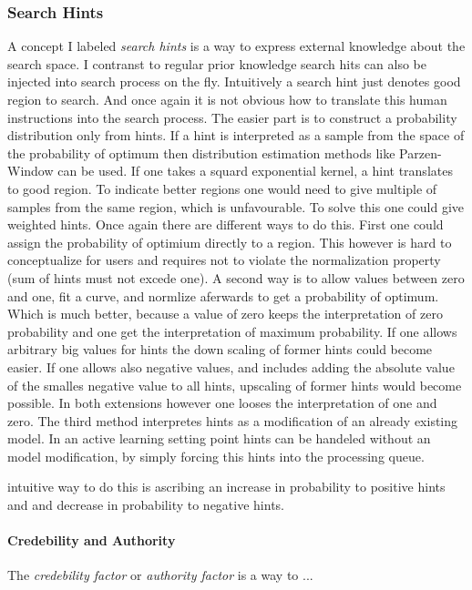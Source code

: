 \documentclass[english]{article}
\begin{document}
\subsubsection*{Search Hints}
A concept I labeled \textit{search hints} is a way to express external knowledge about the search space. I contranst to regular prior knowledge search hits can also be injected into search process on the fly. Intuitively a search hint just denotes good region to search. And once again it is not obvious how to translate this human instructions into the search process.
The easier part is to construct a probability distribution only from hints. If a hint is interpreted as a sample from the space of the probability of optimum then distribution estimation methods like Parzen-Window can be used. If one takes a squard exponential kernel, a hint translates to good region. To indicate better regions one would need to give multiple of samples from the same region, which is unfavourable. To solve this one could give weighted hints. Once again there are different ways to do this.
First one could assign the probability of optimium directly to a region. This however is hard to conceptualize for users and requires not to violate the normalization property (sum of hints must not excede one).
A second way is to allow values between zero and one, fit a curve, and normlize aferwards to get a probability of optimum. Which is much better, because a value of zero keeps the interpretation of zero probability and one get the interpretation of maximum probability. If one allows arbitrary big values for hints the down scaling of former hints could become easier. If one allows also negative values, and includes adding the absolute value of the smalles negative value to all hints, upscaling of former hints would become possible. In both extensions however one looses the interpretation of one and zero.
The third method interpretes hints as a modification of an already existing model.
In an active learning setting point hints can be handeled without an model modification, by simply forcing this hints into the processing queue.

intuitive way to do this is ascribing an increase in probability to positive hints and and decrease in probability to negative hints.

\paragraph{Credebility and Authority}
The \textit{credebility factor} or \textit{authority factor} is a way to ...
\end{document}
